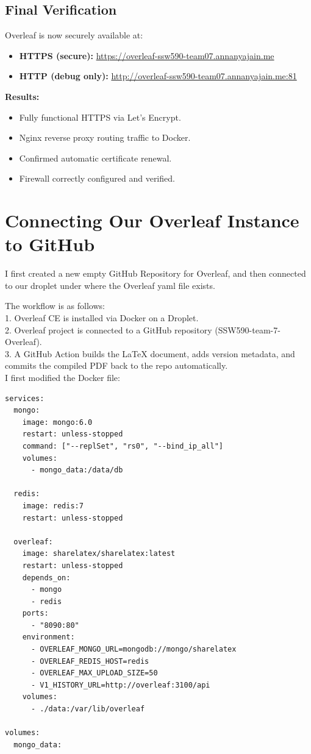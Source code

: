 \subsection{Final Verification}
Overleaf is now securely available at:
\begin{itemize}
    \item \textbf{HTTPS (secure):} \href{https://overleaf-ssw590-team07.annanyajain.me}{https://overleaf-ssw590-team07.annanyajain.me}
    \item \textbf{HTTP (debug only):} \href{http://overleaf-ssw590-team07.annanyajain.me:81}{http://overleaf-ssw590-team07.annanyajain.me:81}
\end{itemize}

\noindent
\textbf{Results:}
\begin{itemize}
    \item Fully functional HTTPS via Let's Encrypt.
    \item Nginx reverse proxy routing traffic to Docker.
    \item Confirmed automatic certificate renewal.
    \item Firewall correctly configured and verified.
\end{itemize}

\section{Connecting Our Overleaf Instance to GitHub}
I first created a new empty GitHub Repository for Overleaf, and then connected to our droplet under where the Overleaf yaml file exists.

The workflow is as follows: \\
1. Overleaf CE is installed via Docker on a Droplet. \\
2. Overleaf project is connected to a GitHub repository (SSW590-team-7-Overleaf). \\
3. A GitHub Action builds the LaTeX document, adds version metadata, and commits the compiled PDF back to the repo automatically. \\

I first modified the Docker file:
\begin{verbatim}
services:
  mongo:
    image: mongo:6.0
    restart: unless-stopped
    command: ["--replSet", "rs0", "--bind_ip_all"]
    volumes:
      - mongo_data:/data/db

  redis:
    image: redis:7
    restart: unless-stopped

  overleaf:
    image: sharelatex/sharelatex:latest
    restart: unless-stopped
    depends_on:
      - mongo
      - redis
    ports:
      - "8090:80"
    environment:
      - OVERLEAF_MONGO_URL=mongodb://mongo/sharelatex
      - OVERLEAF_REDIS_HOST=redis
      - OVERLEAF_MAX_UPLOAD_SIZE=50
      - V1_HISTORY_URL=http://overleaf:3100/api
    volumes:
      - ./data:/var/lib/overleaf

volumes:
  mongo_data:
\end{verbatim}

